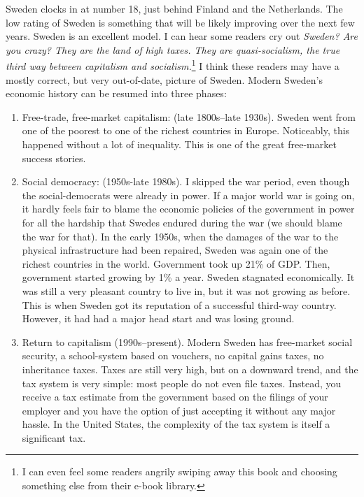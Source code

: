 Sweden clocks in at number 18, just behind Finland and the Netherlands. The low
rating of Sweden is something that will be likely improving over the next few
years. Sweden is an excellent model. I can hear some readers cry out
\emph{Sweden? Are you crazy? They are the land of high taxes. They are
quasi-socialism, the true third way between capitalism and
socialism.}\footnote{I can even feel some readers angrily swiping away this
book and choosing something else from their e-book library.} I think these
readers may have a mostly correct, but very out-of-date, picture of Sweden.
Modern Sweden's economic history can be resumed into three phases:

\begin{enumerate}
\item Free-trade, free-market capitalism: (late 1800s--late 1930s). Sweden went
from one of the poorest to one of the richest countries in Europe. Noticeably,
this happened without a lot of inequality. This is one of the great free-market
success stories.
\item Social democracy: (1950s-late 1980s). I skipped the war period, even
though the social-democrats were already in power. If a major world war is
going on, it hardly feels fair to blame the economic policies of the government
in power for all the hardship that Swedes endured during the war (we should
blame the war for that). In the early 1950s, when the damages of the war to the
physical infrastructure had been repaired, Sweden was again one of the richest
countries in the world. Government took up 21\% of GDP. Then, government
started growing by 1\% a year. Sweden stagnated economically.  It was still a
very pleasant country to live in,  but it was not growing as before. This is
when Sweden got its reputation of a successful third-way country. However, it
had had a major head start and was losing ground.
\item Return to capitalism (1990s--present). Modern Sweden has free-market
social security, a school-system based on vouchers, no capital gains taxes, no
inheritance taxes. Taxes are still very high, but on a downward trend, and the
tax system is very simple: most people do not even file taxes. Instead, you
receive a tax estimate from the government based on the filings of your
employer and you have the option of just accepting it without any major hassle.
In the United States, the complexity of the tax system is itself a significant
tax.
\end{enumerate}

